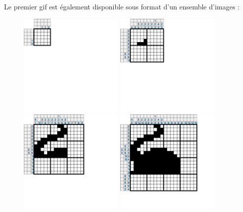 \documentclass{report}
\begin{document}
		Le premier gif est également disponible sous format d'un ensemble d'images :
	
		\begin{figure}[H]
	       	 	\includegraphics[width=5cm]{../Images/cat/cat1.png}
			\hspace{1cm}
          		\includegraphics[width=5cm]{../Images/cat/cat2.png}
			\hspace{1cm}
			\includegraphics[width=5cm]{../Images/cat/cat3.png}
			\hspace{1cm}
          		\includegraphics[width=5cm]{../Images/cat/cat4.png}

\end{figure}
\end{document}
